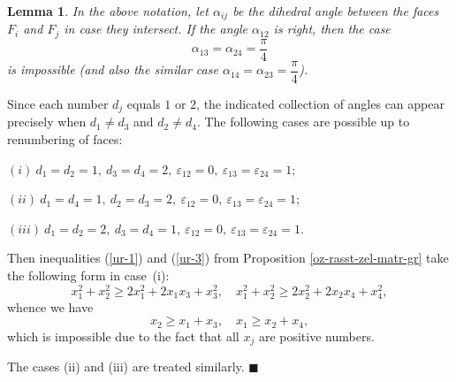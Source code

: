 \documentclass[14pt]{article}
\newtheorem{lemma}{\indent Lemma}[section]
\newenvironment{proof}                    
       {\par\indent{\bf Proof. }} 
	        {\hfill $\scriptstyle\blacksquare$}
\begin{document}
\begin{lemma}\label{lem-nevozm}
In the above notation, let $\alpha_{ij}$ be the dihedral angle between
the faces
$F_i$ and $F_j$ in case they intersect.
If  the angle $\alpha_{12}$ is right,
then the case
$$\alpha_{13} = \alpha_{24} = \dfrac{\pi}{4}$$
is impossible (and also the similar case
$\alpha_{14} = \alpha_{23} = \dfrac{\pi}{4}$).
\end{lemma}
\begin{proof}
Since each number $d_j$ equals $1$ or $2$,  the indicated collection of angles can
appear precisely when $d_1\not = d_3$ and $d_2 \not = d_4$. The
following cases are possible up to renumbering of faces:

$
(i) \ d_1 = d_2 = 1,  \ d_3 = d_4 = 2, \  \varepsilon_{12} = 0,
\ \varepsilon_{13} =
\varepsilon_{24} = 1;
$

$
(ii) \ d_1 = d_4 = 1,  \ d_2 = d_3 = 2, \  \varepsilon_{12} = 0,
\ \varepsilon_{13} =
\varepsilon_{24} = 1;
$

$
(iii) \ d_1 = d_2 = 2,  \ d_3 = d_4 = 1, \  \varepsilon_{12} = 0,
\ \varepsilon_{13} =
\varepsilon_{24} = 1.
$

Then inequalities (\ref{ur-1}) and (\ref{ur-3}) from Proposition
\ref{oz-rasst-zel-matr-gr} take the following form in case~(i):
$$
x_1^2 + x_2^2 \ge 2x_1^2 + 2 x_1 x_3 + x_3^2, \quad
x_1^2 + x_2^2 \ge 2x_2^2 + 2 x_2 x_4 + x_4^2,
$$
whence we have
$$
x_2 \ge x_1 + x_3, \quad x_1 \ge x_2 + x_4,
$$
which is impossible due to the fact that all $x_j$ are  positive numbers.

The cases (ii) and (iii) are treated similarly.
\end{proof}
\end{document}
